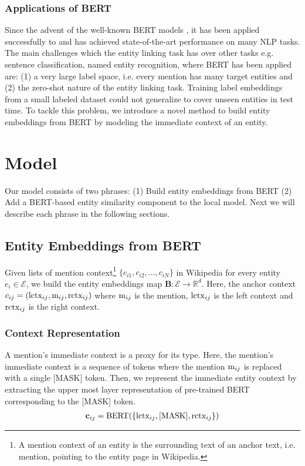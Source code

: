 \documentclass[letterpaper]{article} \usepackage{aaai20}  \usepackage{times}  \usepackage{helvet} \usepackage{courier}  \usepackage[hyphens]{url}  \usepackage{graphicx} \urlstyle{rm} \def\UrlFont{\rm}  \usepackage{graphicx}  \frenchspacing  \setlength{\pdfpagewidth}{8.5in}  \setlength{\pdfpageheight}{11in}  \usepackage{multirow}
\newcommand{\B}{{\mathbf B}}
\begin{document}
    \subsubsection{Applications of BERT}
    Since the advent of the well-known BERT models \cite{devlin-etal-2019-bert}, it has been applied successfully to and has achieved state-of-the-art performance on many NLP tasks. 
    The main challenges which the entity linking task has over other tasks e.g. sentence classification, named entity recognition, where BERT has been applied are: (1) a very large label space, i.e. every mention has many target entities and (2) the zero-shot nature of the entity linking task. Training label embeddings from a small labeled dataset could not generalize to cover unseen entities in test time. To tackle this problem, we introduce a novel method to build entity embeddings from BERT by modeling the immediate context of an entity. 


\section{Model}
Our model consists of two phrases: (1) Build entity embeddings from BERT (2) Add a BERT-based entity similarity component to the local model. Next we will describe each phrase in the following sections.

\subsection{Entity Embeddings from BERT}
Given lists of mention context\footnote{A mention context of an entity is the surrounding text of an anchor text, i.e. mention, pointing to the entity page in Wikipedia.} $\{c_{i1}, c_{i2}, ..., c_{iN}\}$ in Wikipedia for every entity $e_i \in \mathcal{E}$, we build the entity embeddings map $\B : \mathcal{E} \rightarrow \mathbb{R}^d$. Here, the anchor context $c_{ij} = ({\rm lctx}_{ij}, {\rm m}_{ij}, {\rm rctx}_{ij})$ where ${\rm m}_{ij}$ is the mention, ${\rm lctx}_{ij}$ is the left context and ${\rm rctx}_{ij}$ is the right context. 
\subsubsection{Context Representation}
A mention's immediate context is a proxy for its type. Here, the mention's immediate context is a sequence of tokens where the mention ${\rm m}_{ij}$ is replaced with a single [MASK] token. Then, we represent the immediate entity context by extracting the upper most layer representation of pre-trained BERT \cite{devlin-etal-2019-bert} corresponding to the [MASK] token. 
\begin{align}
\mathbf{c}_{ij} = {\rm BERT}(\{{\rm lctx}_{ij}, {\rm [MASK]}, {\rm rctx}_{ij}\}) \label{context_rep}
\end{align}
\end{document}
